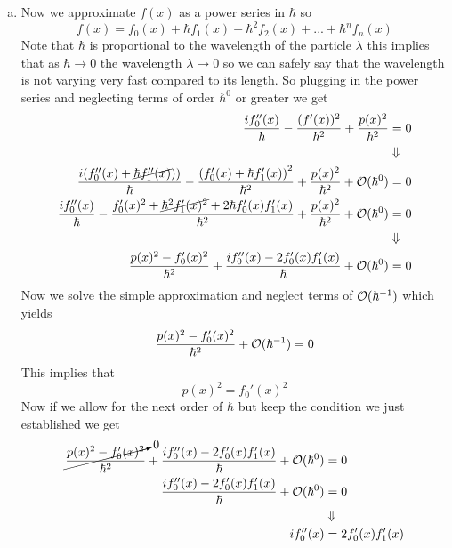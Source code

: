 \documentclass[11pt]{article}
\numberwithin{equation}{section}
\begin{document}
\begin{enumerate}[(a)]
\item
Now we approximate $f(x)$ as a power series in $\hbar$ so
$$f(x) = f_0(x) + \hbar f_1(x) + \hbar^2 f_2(x) + ... + \hbar^n f_n(x)$$
Note that $\hbar$ is proportional to the wavelength of the particle $\lambda$ this implies that as $\hbar\rightarrow 0$ the wavelength $\lambda\rightarrow 0$ so we can safely say that the wavelength is not varying very fast compared to its length. So plugging in the power series and neglecting terms of order $\hbar^0$ or greater we get 
\begin{align*}
\frac{if_0''(x)}{\hbar} - \frac{(f'(x))^2}{\hbar^2} + \frac{p(x)^2}{\hbar^2} &= 0\\
&\Downarrow\\
\frac{i(f_0''(x)+\cancel{\hbar f_1''(x)}))}{\hbar} - \frac{\left(f_0'(x)+\hbar f_1'(x)\right)^2}{\hbar^2} + \frac{p(x)^2}{\hbar^2} + \mathcal{O}(\hbar^0) &= 0\\
\frac{if_0''(x)}{\hbar} - \frac{f_0'(x)^2+\cancel{\hbar^2 f_1'(x)^2} + 2\hbar f_0'(x)f_1'(x)}{\hbar^2} + \frac{p(x)^2}{\hbar^2} + \mathcal{O}(\hbar^0) &= 0\\
&\Downarrow\\
\frac{p(x)^2-f_0'(x)^2}{\hbar^2} +\frac{if_0''(x) - 2f_0'(x)f_1'(x)}{\hbar}  + \mathcal{O}(\hbar^0) &= 0
\end{align*}
Now we solve the simple approximation and neglect terms of $\mathcal{O}(\hbar^{-1})$ which yields
$$\frac{p(x)^2-f_0'(x)^2}{\hbar^2}  + \mathcal{O}(\hbar^{-1}) = 0$$
This implies that
$$p(x)^2 = f_0'(x)^2$$
Now if we allow for the next order of $\hbar$ but keep the condition we just established we get
\begin{align*}
\cancelto{0}{\frac{p(x)^2-f_0'(x)^2}{\hbar^2}} +\frac{if_0''(x) - 2f_0'(x)f_1'(x)}{\hbar}  + \mathcal{O}(\hbar^0) &= 0\\
\frac{if_0''(x) - 2f_0'(x)f_1'(x)}{\hbar}  + \mathcal{O}(\hbar^0) &= 0\\
&\Downarrow\\
if_0''(x) &= 2f_0'(x)f_1'(x)
\end{align*}


\end{enumerate}
\end{document}
